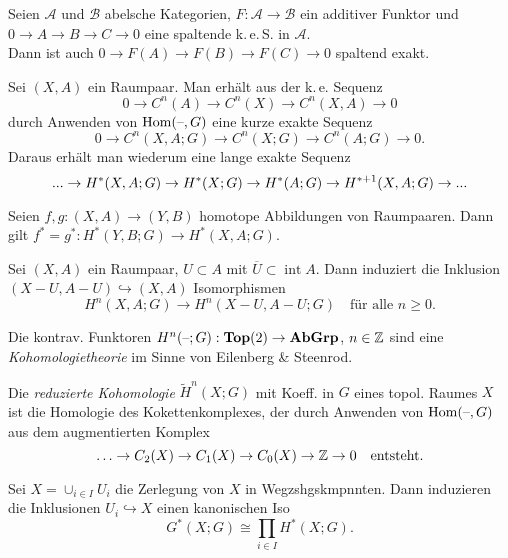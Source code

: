 \documentclass{cheat-sheet}
\newcommand{\Top}{\mathbf{Top}} %
\newcommand{\AbGrp}{\mathbf{AbGrp}} %
\newcommand{\RH}{\tilde{H}} %
\DeclareMathOperator{\inte}{int} %
\newcommand{\clos}[1]{\overline{#1}} %
\DeclareMathOperator{\Hom}{Hom} %
\newcommand{\keS}{k.\,e.\,S.} %
\begin{document}
\begin{prop}
  Seien $\mathcal{A}$ und $\mathcal{B}$ abelsche Kategorien, $F : \mathcal{A} \to \mathcal{B}$ ein additiver Funktor und $0 \to A \to B \to C \to 0$ eine spaltende \keS{} in $\mathcal{A}$.\\
  Dann ist auch $0 \to F(A) \to F(B) \to F(C) \to 0$ spaltend exakt.
\end{prop}

\begin{bem}
  Sei $(X, A)$ ein Raumpaar.
  Man erhält aus der k.\,e. Sequenz
  \[ 0 \to C^n(A) \to C^n(X) \to C^n(X, A) \to 0 \]
  durch Anwenden von $\Hom(\blank, G)$ eine kurze exakte Sequenz
  \[ 0 \to C^n(X, A; G) \to C^n(X; G) \to C^n(A; G) \to 0. \]
  Daraus erhält man wiederum eine lange exakte Sequenz
  \[ ... \to H^*(X, A; G) \to H^*(X; G) \to H^*(A; G) \to H^{*+1}(X, A; G) \to ... \]
\end{bem}

\begin{prop}
  Seien $f, g : (X, A) \to (Y, B)$ homotope Abbildungen von Raumpaaren. Dann gilt
  $f^* = g^* : H^*(Y, B; G) \to H^*(X, A; G)$.
\end{prop}

\begin{satz}
  Sei $(X, A)$ ein Raumpaar, $U \subset A$ mit $\clos{U} \subset \inte A$. Dann induziert die Inklusion $(X - U, A - U) \hookrightarrow (X, A)$ Isomorphismen
  \[ H^n(X, A; G) \to H^n(X - U, A - U; G) \quad \text{für alle $n \geq 0$.} \]
\end{satz}

\begin{bem}
  Die kontrav. Funktoren $H^n(\blank; G) : \Top(2) \to \AbGrp$, $n \in \mathbb{Z}$ sind eine \emph{Kohomologietheorie} im Sinne von Eilenberg \& Steenrod.
\end{bem}

\begin{defn}
  Die \emph{reduzierte Kohomologie} $\RH^n(X; G)$ mit Koeff. in $G$ eines topol. Raumes $X$ ist die Homologie des Kokettenkomplexes, der durch Anwenden von $\Hom(\blank, G)$ aus dem augmentierten Komplex
  \[
    \ldots \to C_2(X) \to C_1(X) \to C_0(X) \to \mathbb{Z} \to 0
    \quad \text{entsteht.}
  \]
\end{defn}


\begin{prop}
  Sei $X = \cup_{i \in I} U_i$ die Zerlegung von $X$ in Wegzshgskmpnnten. Dann induzieren die Inklusionen $U_i \hookrightarrow X$ einen kanonischen Iso
  \[ G^*(X; G) \cong \prod_{i \in I} H^*(X; G). \]
\end{prop}
\end{document}
